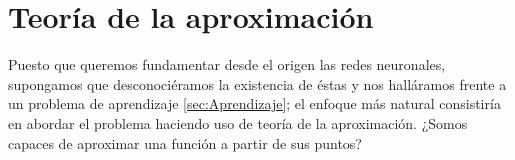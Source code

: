 
\chapter{Teoría de la aproximación}
 \label{ch03:teoria-aproximar}

 Puesto que queremos fundamentar desde el origen las redes neuronales,
 supongamos que desconociéramos la existencia de éstas
 y nos halláramos frente a un problema de aprendizaje \ref{sec:Aprendizaje}; 
 el enfoque más natural consistiría en abordar el problema 
 haciendo uso de teoría de la aproximación.  
 ¿Somos capaces de aproximar una función a partir de sus puntos?





